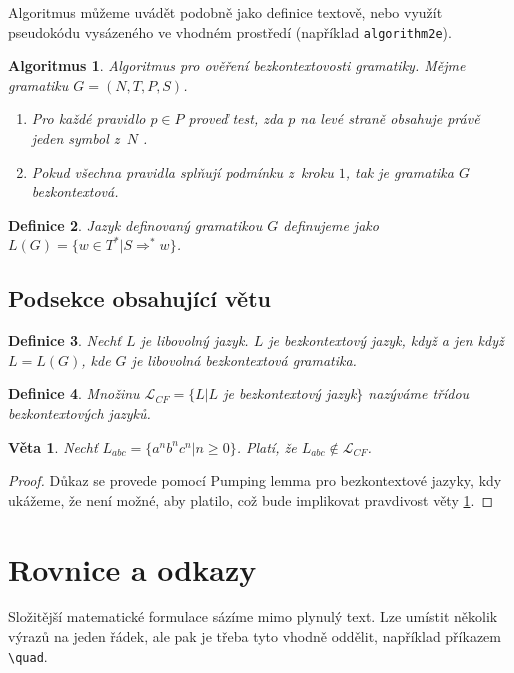 \documentclass[a4paper, 11pt, twocolumn]{article}
\newtheorem{definice}{Definice}[section]
\newtheorem{algoritmus}[definice]{Algoritmus}
\newtheorem{veta}{Věta}
\begin{document}
Algoritmus můžeme uvádět podobně jako definice textově, nebo využít pseudokódu vysázeného ve vhodném prostředí (například \texttt{algorithm2e}).

\begin{algoritmus}
Algoritmus pro ověření bezkontextovosti gramatiky. Mějme gramatiku $G = (N, T, P, S)$.
\begin{enumerate}
\item Pro každé pravidlo $p \in P$ proveď test, zda $p$ na levé straně obsahuje právě jeden symbol z~$N$ .
\item Pokud všechna pravidla splňují podmínku z~kroku $1$, tak je gramatika $G$ bezkontextová.
\end{enumerate}
\end{algoritmus}

\begin{definice}
Jazyk definovaný gramatikou $G$ definujeme jako $L(G)=\{ w\in T^* |S \Rightarrow^* w\}$.
\end{definice}

\subsection{Podsekce obsahující větu}
\begin{definice}
\emph{Nechť $L$ je libovolný jazyk. $L$ je} bezkontextový jazyk, \emph{když a jen když $L=L(G)$, kde $G$ je libovolná bezkontextová gramatika.}
\end{definice}

\begin{definice}
\emph{Množinu $\mathcal{L}_{CF} = \{ L|L$ je bezkontextový jazyk$\}$ nazýváme} třídou bezkontextových jazyků.
\end{definice}

\begin{veta}
\label{veta1}Nechť $L_{abc}=\{ a^n b^n c^n |n\geq 0\}$. Platí, že $L_{abc} \notin \mathcal{L}_{CF}$.
\end{veta}

\begin{proof}
Důkaz se provede pomocí Pumping lemma pro bezkontextové jazyky, kdy ukážeme, že není možné, aby platilo, což bude implikovat pravdivost věty \ref{veta1}.
\end{proof}

\section{Rovnice a odkazy}
Složitější matematické formulace sázíme mimo plynulý text. Lze umístit několik výrazů na jeden řádek, ale pak je třeba tyto vhodně oddělit, například příkazem \verb|\quad|. 
\end{document}

